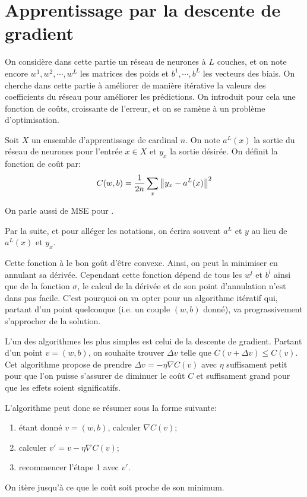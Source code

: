 \section{Apprentissage par la descente de gradient}


On considère dans cette partie un réseau de neurones à $L$ couches, et on note 
encore $w^{1}, w^{2}, \cdots, w^{L}$ les matrices des poids et $b^{1}, \cdots, b^{L}$
les vecteurs des biais. 
On cherche dans cette partie à améliorer de manière itérative la valeurs des 
coefficients du réseau pour améliorer les prédictions. 
On introduit pour cela une fonction de coûts, croissante de l'erreur, et 
on se ramène à un problème d'optimisation.

\begin{definition}
Soit $X$ un ensemble d'apprentissage de cardinal $n$. 
On note $a^{L}(x)$ la sortie du réseau de neurones pour l'entrée $x \in X$ et 
$y_{x}$ la sortie désirée. On définit la fonction de coût par:
\[
C(w, b) = \frac{1}{2n} \sum_{x} \left\Vert y_{x} - a^{L}(x)\right\Vert^2
\]
\end{definition}

On parle aussi de \textsc{MSE} pour .

Par la suite, et pour alléger les notations, on écrira souvent $a^{L}$ et $y$ 
au lieu de $a^{L}(x)$ et $y_x$.

Cette fonction à le bon goût d'être convexe. Ainsi, on peut la minimiser en annulant 
sa dérivée. 
Cependant cette fonction dépend de tous les $w^{l}$ et $b^{l}$ ainsi que de la fonction 
$\sigma$, le calcul de la dérivée et de son point d'annulation n'est dans pas facile.
C'est pourquoi on va opter pour un algorithme itératif qui, partant d'un point quelconque 
(i.e.\/ un couple $(w,b)$ donné), va prograssivement s'approcher de la solution. 

L'un des algorithmes les plus simples est celui de la descente de gradient.
Partant d'un point $v = (w,b)$, on souhaite trouver $\Delta v$ telle que 
$C(v + \Delta v) \leq C(v)$. Cet algorithme propose de prendre 
$\Delta v = -\eta\nabla C(v)$ avec $\eta$ suffisament petit pour que 
l'on puisse s'assurer de diminuer le coût $C$ et suffisament grand pour que les 
effets soient significatifs.

L'algorithme peut donc se résumer sous la forme suivante:
\begin{enumerate}
  \item étant donné $v = (w, b)$, calculer $\nabla C(v)$;
  \item calculer $v' = v - \eta \nabla C(v)$;
  \item recommencer l'étape 1 avec $v'$.
\end{enumerate}
On itère jusqu'à ce que le coût soit proche de son minimum.

